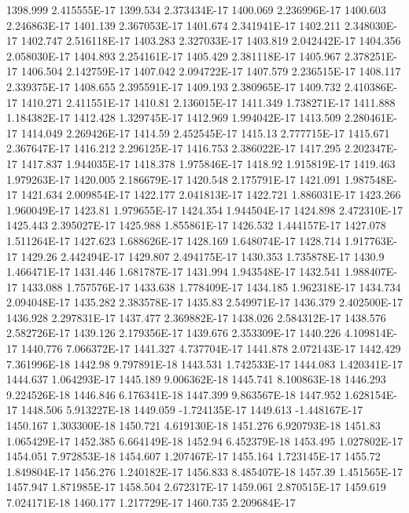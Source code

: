 1398.999  2.415555E-17
1399.534  2.373434E-17
1400.069  2.236996E-17
1400.603  2.246863E-17
1401.139  2.367053E-17
1401.674  2.341941E-17
1402.211  2.348030E-17
1402.747  2.516118E-17
1403.283  2.327033E-17
1403.819  2.042442E-17
1404.356  2.058030E-17
1404.893  2.254161E-17
1405.429  2.381118E-17
1405.967  2.378251E-17
1406.504  2.142759E-17
1407.042  2.094722E-17
1407.579  2.236515E-17
1408.117  2.339375E-17
1408.655  2.395591E-17
1409.193  2.380965E-17
1409.732  2.410386E-17
1410.271  2.411551E-17
1410.81  2.136015E-17
1411.349  1.738271E-17
1411.888  1.184382E-17
1412.428  1.329745E-17
1412.969  1.994042E-17
1413.509  2.280461E-17
1414.049  2.269426E-17
1414.59  2.452545E-17
1415.13  2.777715E-17
1415.671  2.367647E-17
1416.212  2.296125E-17
1416.753  2.386022E-17
1417.295  2.202347E-17
1417.837  1.944035E-17
1418.378  1.975846E-17
1418.92  1.915819E-17
1419.463  1.979263E-17
1420.005  2.186679E-17
1420.548  2.175791E-17
1421.091  1.987548E-17
1421.634  2.009854E-17
1422.177  2.041813E-17
1422.721  1.886031E-17
1423.266  1.960049E-17
1423.81  1.979655E-17
1424.354  1.944504E-17
1424.898  2.472310E-17
1425.443  2.395027E-17
1425.988  1.855861E-17
1426.532  1.444157E-17
1427.078  1.511264E-17
1427.623  1.688626E-17
1428.169  1.648074E-17
1428.714  1.917763E-17
1429.26  2.442494E-17
1429.807  2.494175E-17
1430.353  1.735878E-17
1430.9  1.466471E-17
1431.446  1.681787E-17
1431.994  1.943548E-17
1432.541  1.988407E-17
1433.088  1.757576E-17
1433.638  1.778409E-17
1434.185  1.962318E-17
1434.734  2.094048E-17
1435.282  2.383578E-17
1435.83  2.549971E-17
1436.379  2.402500E-17
1436.928  2.297831E-17
1437.477  2.369882E-17
1438.026  2.584312E-17
1438.576  2.582726E-17
1439.126  2.179356E-17
1439.676  2.353309E-17
1440.226  4.109814E-17
1440.776  7.066372E-17
1441.327  4.737704E-17
1441.878  2.072143E-17
1442.429  7.361996E-18
1442.98  9.797891E-18
1443.531  1.742533E-17
1444.083  1.420341E-17
1444.637  1.064293E-17
1445.189  9.006362E-18
1445.741  8.100863E-18
1446.293  9.224526E-18
1446.846  6.176341E-18
1447.399  9.863567E-18
1447.952  1.628154E-17
1448.506  5.913227E-18
1449.059  -1.724135E-17
1449.613  -1.448167E-17
1450.167  1.303300E-18
1450.721  4.619130E-18
1451.276  6.920793E-18
1451.83  1.065429E-17
1452.385  6.664149E-18
1452.94  6.452379E-18
1453.495  1.027802E-17
1454.051  7.972853E-18
1454.607  1.207467E-17
1455.164  1.723145E-17
1455.72  1.849804E-17
1456.276  1.240182E-17
1456.833  8.485407E-18
1457.39  1.451565E-17
1457.947  1.871985E-17
1458.504  2.672317E-17
1459.061  2.870515E-17
1459.619  7.024171E-18
1460.177  1.217729E-17
1460.735  2.209684E-17
